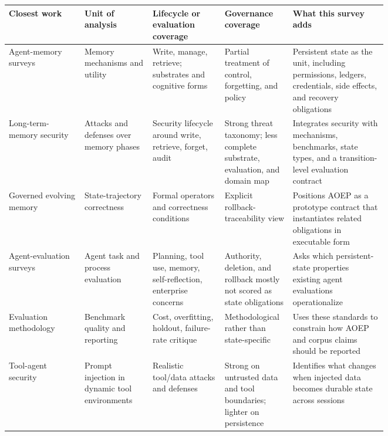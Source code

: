 \begin{table}[t]
\centering
\scriptsize
\setlength{\tabcolsep}{3pt}\renewcommand{\arraystretch}{1.18}
\begin{tabularx}{\linewidth}{p{0.20\linewidth}p{0.18\linewidth}p{0.19\linewidth}p{0.18\linewidth}Y}
\toprule
Closest work & Unit of analysis & Lifecycle or evaluation coverage & Governance coverage & What this survey adds \\
\midrule
Agent-memory surveys \citep{du2026memoryautonomous,huang2026rethinkingmemorymechanisms,hu2025memoryageaiagents} & Memory mechanisms and utility & Write, manage, retrieve; substrates and cognitive forms & Partial treatment of control, forgetting, and policy & Persistent state as the unit, including permissions, ledgers, credentials, side effects, and recovery obligations \\
Long-term-memory security \citep{lin2026surveylongtermmemorysecurity} & Attacks and defenses over memory phases & Security lifecycle around write, retrieve, forget, audit & Strong threat taxonomy; less complete substrate, evaluation, and domain map & Integrates security with mechanisms, benchmarks, state types, and a transition-level evaluation contract \\
Governed evolving memory \citep{orogat2026gem} & State-trajectory correctness & Formal operators and correctness conditions & Explicit rollback-traceability view & Positions AOEP as a prototype contract that instantiates related obligations in executable form \\
Agent-evaluation surveys \citep{yehudai2025surveyevaluationllmagents,mohammadi2025evalbenchmarkingllmagents} & Agent task and process evaluation & Planning, tool use, memory, self-reflection, enterprise concerns & Authority, deletion, and rollback mostly not scored as state obligations & Asks which persistent-state properties existing agent evaluations operationalize \\
Evaluation methodology \citep{kapoor2024aiagentsthatmatter} & Benchmark quality and reporting & Cost, overfitting, holdout, failure-rate critique & Methodological rather than state-specific & Uses these standards to constrain how AOEP and corpus claims should be reported \\
Tool-agent security \citep{debenedetti2024agentdojodynamicenvironmentevaluate} & Prompt injection in dynamic tool environments & Realistic tool/data attacks and defenses & Strong on untrusted data and tool boundaries; lighter on persistence & Identifies what changes when injected data becomes durable state across sessions \\

\end{tabularx}
\end{table}
